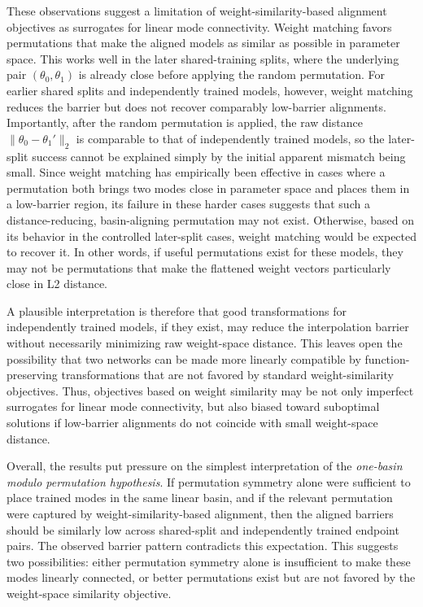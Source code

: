 \documentclass[11pt,a4paper]{report}
\begin{document}
These observations suggest a limitation of weight-similarity-based alignment objectives as surrogates for linear mode connectivity. Weight matching favors permutations that make the aligned models as similar as possible in parameter space. This works well in the later shared-training splits, where the underlying pair \((\theta_0,\theta_1)\) is already close before applying the random permutation. For earlier shared splits and independently trained models, however, weight matching reduces the barrier but does not recover comparably low-barrier alignments. Importantly, after the random permutation is applied, the raw distance $\|\theta_0 - \theta_1'\|_2$ is comparable to that of independently trained models, so the later-split success cannot be explained simply by the initial apparent mismatch being small. Since weight matching has empirically been effective in cases where a permutation both brings two modes close in parameter space and places them in a low-barrier region, its failure in these harder cases suggests that such a distance-reducing, basin-aligning permutation may not exist. Otherwise, based on its behavior in the controlled later-split cases, weight matching would be expected to recover it. In other words, if useful permutations exist for these models, they may not be permutations that make the flattened weight vectors particularly close in L2 distance.

A plausible interpretation is therefore that good transformations for independently trained models, if they exist, may reduce the interpolation barrier without necessarily minimizing raw weight-space distance. This leaves open the possibility that two networks can be made more linearly compatible by function-preserving transformations that are not favored by standard weight-similarity objectives. Thus, objectives based on weight similarity may be not only imperfect surrogates for linear mode connectivity, but also biased toward suboptimal solutions if low-barrier alignments do not coincide with small weight-space distance.


Overall, the results put pressure on the simplest interpretation of the \textit{one-basin modulo permutation hypothesis}. If permutation symmetry alone were sufficient to place trained modes in the same linear basin, and if the relevant permutation were captured by weight-similarity-based alignment, then the aligned barriers should be similarly low across shared-split and independently trained endpoint pairs. The observed barrier pattern contradicts this expectation. This suggests two possibilities: either permutation symmetry alone is insufficient to make these modes linearly connected, or better permutations exist but are not favored by the weight-space similarity objective.
\end{document}
